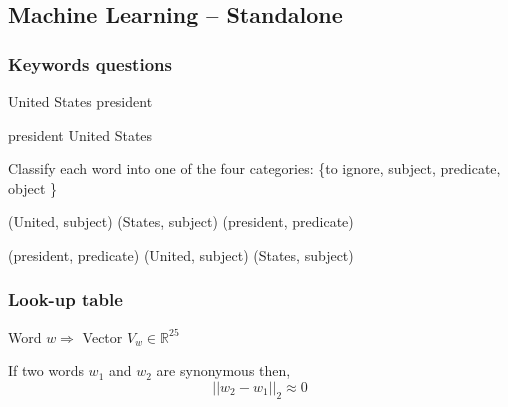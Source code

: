 \subsection{Machine Learning \--- Standalone}

\begin{frame}[fragile]
  \frametitle{Keywords questions}

	
	\begin{center}
  	\alert{United States president}
	\end{center}

	\begin{center}
  	\alert{president United States}
	\end{center}

\end{frame}

\begin{frame}[fragile]

Classify each word into one of the four categories: \{to ignore, subject, predicate, object \}

\end{frame}

\begin{frame}[fragile]

	\begin{center}
  	\alert{(United, subject) (States, subject) (president, predicate)}
	\end{center}

	\begin{center}
  	\alert{(president, predicate) (United, subject) (States, subject)}
	\end{center}



\end{frame}

\begin{frame}[fragile]
  \frametitle{Look-up table}

	\begin{center}
	Word $w \Rightarrow $ Vector $ V_w \in \mathbb{R}^{25}$
	\end{center}

	\begin{center}
	If two words $w_1$ and $w_2$ are synonymous then, \newline
	$$ || w_2 - w_1 ||_2 \approx 0 $$
	
	\end{center}



\end{frame}



